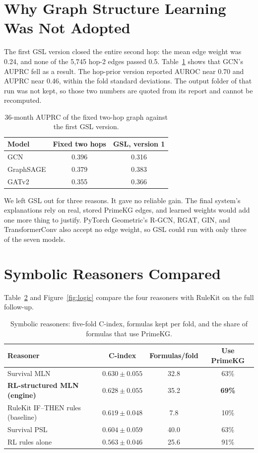 \documentclass{mnnit}
\begin{document}
\section{Why Graph Structure Learning Was Not Adopted}\label{sec:gslresults}
The first GSL version closed the entire second hop: the mean edge weight was 0.24, and none of the 5,745 hop-2 edges
passed 0.5. Table~\ref{tab:gsl} shows that GCN's AUPRC fell as a result. The hop-prior version reported AUROC near 0.70 and
AUPRC near 0.46, within the fold standard deviations. The output folder of that run was not kept, so those two numbers
are quoted from its report and cannot be recomputed.

\begin{table}[!htbp]
  \centering
  \small\setlength{\tabcolsep}{5pt}
  \caption{36-month AUPRC of the fixed two-hop graph against the first GSL version.}
  \label{tab:gsl}
  \begin{tabular}{lcc}
    \toprule
    Model & Fixed two hops & GSL, version 1 \\
    \midrule
    GCN & 0.396 & 0.316 \\
    GraphSAGE & 0.379 & 0.383 \\
    GATv2 & 0.355 & 0.366 \\
    \bottomrule
  \end{tabular}
\end{table}

We left GSL out for three reasons. It gave no reliable gain. The final system's explanations rely on real, stored PrimeKG
edges, and learned weights would add one more thing to justify. PyTorch Geometric's R-GCN, RGAT, GIN, and TransformerConv
also accept no edge weight, so GSL could run with only three of the seven models.

\section{Symbolic Reasoners Compared}\label{sec:logicresults}
Table~\ref{tab:logic} and Figure~\ref{fig:logic} compare the four reasoners with RuleKit on the full follow-up.

\begin{table}[!htbp]
  \centering
  \small\setlength{\tabcolsep}{4pt}
  \caption{Symbolic reasoners: five-fold C-index, formulas kept per fold, and the share of formulas that use PrimeKG.}
  \label{tab:logic}
  \begin{tabular}{lccc}
    \toprule
    Reasoner & C-index & Formulas/fold & Use PrimeKG \\
    \midrule
    Survival MLN & $0.630 \pm 0.055$ & 32.8 & 63\% \\
    \textbf{RL-structured MLN (engine)} & $\mathbf{0.628 \pm 0.055}$ & 35.2 & \textbf{69\%} \\
    RuleKit IF--THEN rules (baseline) & $0.619 \pm 0.048$ & 7.8 & 10\% \\
    Survival PSL & $0.604 \pm 0.059$ & 40.0 & 63\% \\
    RL rules alone & $0.563 \pm 0.046$ & 25.6 & 91\% \\
    \bottomrule
  \end{tabular}
\end{table}
\end{document}
